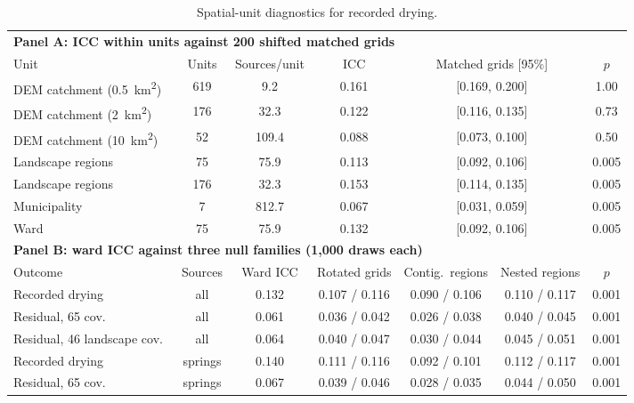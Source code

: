 \documentclass[preprint,12pt,authoryear]{elsarticle}
\begin{document}
\begin{table}[!htbp]
  \centering
  \caption{Spatial-unit diagnostics for recorded drying.}
  \label{tab:spatial_units}
  \footnotesize
  \setlength{\tabcolsep}{4pt}
  \begin{adjustbox}{max width=\linewidth}
  \begin{tabular}{lcccccc}
    \toprule
    \multicolumn{7}{l}{\textbf{Panel A: ICC within units against 200 shifted matched grids}} \\
    Unit & Units & Sources/unit & ICC & \multicolumn{2}{c}{Matched grids [95\%]} & $p$ \\
    \midrule
    DEM catchment (\SI{0.5}{\kilo\metre\squared}) & 619 & 9.2 & 0.161 & \multicolumn{2}{c}{[0.169, 0.200]} & 1.00 \\
    DEM catchment (\SI{2}{\kilo\metre\squared}) & 176 & 32.3 & 0.122 & \multicolumn{2}{c}{[0.116, 0.135]} & 0.73 \\
    DEM catchment (\SI{10}{\kilo\metre\squared}) & 52 & 109.4 & 0.088 & \multicolumn{2}{c}{[0.073, 0.100]} & 0.50 \\
    Landscape regions & 75 & 75.9 & 0.113 & \multicolumn{2}{c}{[0.092, 0.106]} & 0.005 \\
    Landscape regions & 176 & 32.3 & 0.153 & \multicolumn{2}{c}{[0.114, 0.135]} & 0.005 \\
    Municipality & 7 & 812.7 & 0.067 & \multicolumn{2}{c}{[0.031, 0.059]} & 0.005 \\
    Ward & 75 & 75.9 & 0.132 & \multicolumn{2}{c}{[0.092, 0.106]} & 0.005 \\
    \midrule
    \multicolumn{7}{l}{\textbf{Panel B: ward ICC against three null families (1,000 draws each)}} \\
    Outcome & Sources & Ward ICC & Rotated grids & Contig.\ regions & Nested regions & $p$ \\
    \midrule
    Recorded drying & all & 0.132 & 0.107 / 0.116 & 0.090 / 0.106 & 0.110 / 0.117 & 0.001 \\
    Residual, 65 cov.\ & all & 0.061 & 0.036 / 0.042 & 0.026 / 0.038 & 0.040 / 0.045 & 0.001 \\
    Residual, 46 landscape cov.\ & all & 0.064 & 0.040 / 0.047 & 0.030 / 0.044 & 0.045 / 0.051 & 0.001 \\
    Recorded drying & springs & 0.140 & 0.111 / 0.116 & 0.092 / 0.101 & 0.112 / 0.117 & 0.001 \\
    Residual, 65 cov.\ & springs & 0.067 & 0.039 / 0.046 & 0.028 / 0.035 & 0.044 / 0.050 & 0.001 \\

\end{tabular}
\end{adjustbox}
\end{table}
\end{document}
